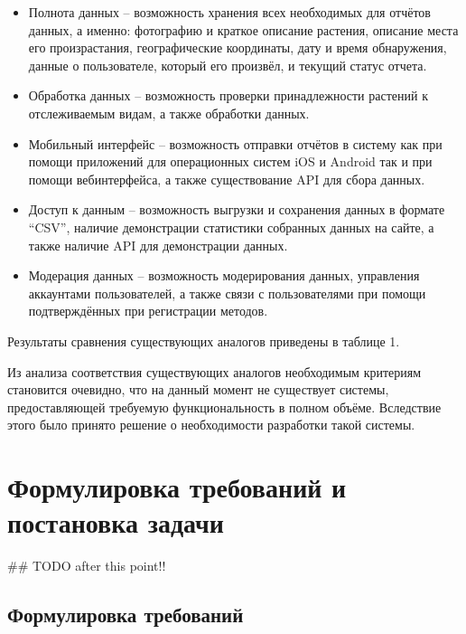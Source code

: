\begin{itemize}[topsep=0pt, parsep=0pt, itemsep=0pt, wide=0.5cm]
	\item Полнота данных -- возможность хранения всех необходимых для отчётов данных, а именно: фотографию и краткое описание растения, описание места его произрастания, географические координаты, дату и время обнаружения, данные о пользователе, который его произвёл, и текущий статус отчета.
	\item Обработка данных -- возможность проверки принадлежности растений к отслеживаемым видам, а также обработки данных.
	\item Мобильный интерфейс -- возможность отправки отчётов в систему как при помощи приложений для операционных систем iOS и Android так и при помощи вебинтерфейса, а также существование API для сбора данных.
	\item Доступ к данным -- возможность выгрузки и сохранения данных в формате “CSV”, наличие демонстрации статистики собранных данных на сайте, а также наличие API для демонстрации данных.
	\item Модерация данных -- возможность модерирования данных, управления аккаунтами пользователей, а также связи с пользователями при помощи подтверждённых при регистрации методов.
\end{itemize}

\nwln
Результаты сравнения существующих аналогов приведены в таблице 1.
\tableone

\nwln
Из анализа соответствия существующих аналогов необходимым критериям становится очевидно, что на данный момент не существует системы, предоставляющей требуемую функциональность в полном объёме.
Вследствие этого было принято решение о необходимости разработки такой системы.

\section{Формулировка требований и постановка задачи}

\#\# TODO after this point!!

\subsection{Формулировка требований}

